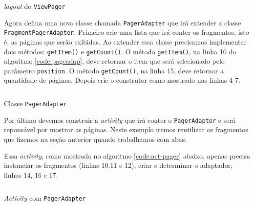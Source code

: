 \documentclass[a4paper,12pt,brazil]{book}
\begin{document}
\begin{singlespace}
	\begin{listing}[H]
	\inputminted[linenos=true,fontsize=\small,frame=lines, framesep=2mm, tabsize=2,numbersep=5pt]{xml}{src/design/viewpager.xml}
	\caption{\emph{layout} do \texttt{ViewPager}}
	\end{listing}
	
	Agora defina uma nova classe chamada \texttt{PagerAdapter} que irá extender a classe \texttt{FragmentPagerAdapter}. Primeiro crie uma lista que irá conter os fragmentos, isto é, as páginas que serão exibidas. Ao extender essa classe precisamos implementar dois métodos: \texttt{getItem()} e \texttt{getCount()}. O método \texttt{getItem()}, na linha 10 do algoritmo \ref{code:pageadap}, deve retornar o item que será selecionado pelo parâmetro \texttt{position}. O método \texttt{getCount()}, na linha 15, deve retornar a quantidade de páginas. Depois crie o construtor como mostrado nas linhas 4-7. 

	\begin{listing}[H]
	\inputminted[linenos=true,fontsize=\small,frame=lines, framesep=2mm, tabsize=2,numbersep=5pt]{java}{src/design/pageradapter.java}
	\caption{Classe \texttt{PagerAdapter}}
	\label{code:pageadap}
	\end{listing}
	
	Por último devemos construir a \emph{activity} que irá conter o \texttt{PagerAdapter} e será reponsável por mostrar as páginas. Neste exemplo iremos reutilizar os fragmentos que fizemos na seção anterior quando trabalhamos com abas.
	
	
	Essa \emph{activity}, como mostrada no algoritmo \ref{code:act-pager} abaixo, apenas precisa instanciar os fragmentos (linhas 10,11 e 12), criar e determinar o adaptador, linhas 14, 16 e 17.
	
	\begin{listing}[H]
	\inputminted[linenos=true,fontsize=\small,frame=lines, framesep=2mm, tabsize=2,numbersep=5pt]{java}{src/design/viewpager-activity.java}
	\caption{\emph{Activity} com \texttt{PagerAdapter}}
	\label{code:act-pager}
	\end{listing}


\end{singlespace}
\end{document}

